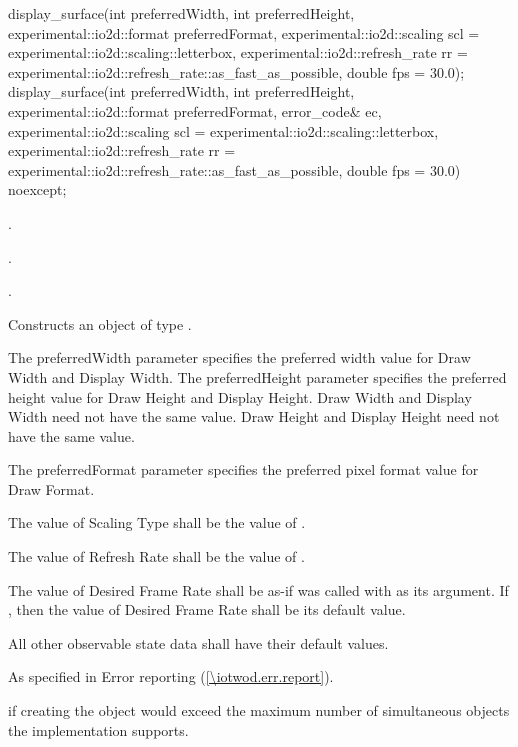 \begin{itemdecl}
display_surface(int preferredWidth, int preferredHeight, 
  experimental::io2d::format preferredFormat,
  experimental::io2d::scaling scl = experimental::io2d::scaling::letterbox,
  experimental::io2d::refresh_rate rr =
  experimental::io2d::refresh_rate::as_fast_as_possible, double fps = 30.0);
display_surface(int preferredWidth, int preferredHeight, 
  experimental::io2d::format preferredFormat, error_code& ec,
  experimental::io2d::scaling scl = experimental::io2d::scaling::letterbox,
  experimental::io2d::refresh_rate rr =
  experimental::io2d::refresh_rate::as_fast_as_possible, double fps = 30.0)
  noexcept;
\end{itemdecl}
\begin{itemdescr}
\pnum
\requires
{}.

\pnum
{}.

\pnum
{}.


\pnum
\effects
Constructs an object of type .

\pnum
The preferredWidth parameter specifies the preferred width value for Draw Width and Display Width. The preferredHeight parameter specifies the preferred height value for Draw Height and Display Height. Draw Width and Display Width need not have the same value. Draw Height and Display Height need not have the same value.

\pnum
The preferredFormat parameter specifies the preferred pixel format value for Draw Format.

\pnum
The value of Scaling Type shall be the value of .

\pnum
The value of Refresh Rate shall be the value of .

\pnum
The value of Desired Frame Rate shall be as-if  was called with  as its argument. If , then the value of Desired Frame Rate shall be its default value.

\pnum
All other observable state data shall have their default values.

\pnum
\throws
As specified in Error reporting (\ref{\iotwod.err.report}).

\pnum
\errors
{} if creating the  object would exceed the maximum number of simultaneous  objects the implementation supports.
\end{itemdescr}

